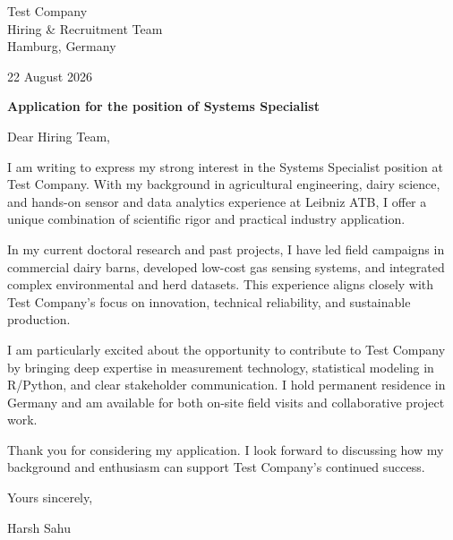 \documentclass[10pt,a4paper]{article}
\begin{document}

Test Company\\

Hiring \& Recruitment Team\\

Hamburg, Germany

\vspace{10pt}
22 August 2026

\vspace{10pt}
\textbf{Application for the position of Systems Specialist}


\vspace{8pt}
Dear Hiring Team,


I am writing to express my strong interest in the Systems Specialist position at Test Company. With my background in agricultural engineering, dairy science, and hands-on sensor and data analytics experience at Leibniz ATB, I offer a unique combination of scientific rigor and practical industry application.

\vspace{4pt}

In my current doctoral research and past projects, I have led field campaigns in commercial dairy barns, developed low-cost gas sensing systems, and integrated complex environmental and herd datasets. This experience aligns closely with Test Company's focus on innovation, technical reliability, and sustainable production.

\vspace{4pt}

I am particularly excited about the opportunity to contribute to Test Company by bringing deep expertise in measurement technology, statistical modeling in R/Python, and clear stakeholder communication. I hold permanent residence in Germany and am available for both on-site field visits and collaborative project work.

\vspace{4pt}

Thank you for considering my application. I look forward to discussing how my background and enthusiasm can support Test Company's continued success.

\vspace{4pt}


Yours sincerely,

\vspace{14pt}
Harsh Sahu
\end{document}
